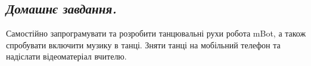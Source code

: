 \documentclass[12pt, a4paper]{article}
\begin{document}
\subsection*{\textit{Домашнє завдання.}}
Самостійно запрограмувати та розробити танцювальні рухи робота mBot, а також спробувати включити музику в танці. Зняти танці на мобільний телефон та надіслати відеоматеріал вчителю.

	
\end{document}
